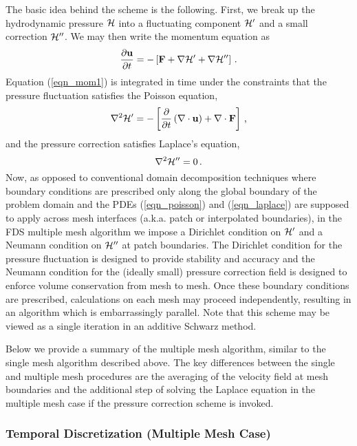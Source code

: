 \documentclass[11pt]{book}
\begin{document}
The basic idea behind the scheme is the following.  First, we break up the hydrodynamic pressure ${\cal H}$ into a fluctuating component ${\cal H}'$ and a small correction $\cal H''$.  We may then write the momentum equation as
\begin{equation}
\label{eqn_mom1}
\frac{\partial \mathbf{u}}{\partial t} = - \left[ \mathbf{F} + \nabla {\cal H}' + \nabla {\cal H}'' \right] \,\mbox{.}
\end{equation}
Equation (\ref{eqn_mom1}) is integrated in time under the constraints that the pressure fluctuation satisfies the Poisson equation,
\begin{equation}
\label{eqn_poisson}
\nabla^2 {\cal H}' = - \left[ \frac{\partial}{\partial t} \left(\nabla\cdot \mathbf{u}\right) + \nabla\cdot \mathbf{F} \right] \,\mbox{,}
\end{equation}
and the pressure correction satisfies Laplace's equation,
\begin{equation}
\label{eqn_laplace}
\nabla^2 {\cal H}'' = 0 \,\mbox{.}
\end{equation}
Now, as opposed to conventional domain decomposition techniques where boundary conditions are prescribed only along the global boundary of the problem domain and the PDEs (\ref{eqn_poisson}) and (\ref{eqn_laplace}) are supposed to apply across mesh interfaces (a.k.a. patch or interpolated boundaries), in the FDS multiple mesh algorithm we impose a Dirichlet condition on ${\cal H}^\prime$ and a Neumann condition on ${\cal H}^{\prime\prime}$ at patch boundaries.  The Dirichlet condition for the pressure fluctuation is designed to provide stability and accuracy and the Neumann condition for the (ideally small) pressure correction field is designed to enforce volume conservation from mesh to mesh.  Once these boundary conditions are prescribed, calculations on each mesh may proceed independently, resulting in an algorithm which is embarrassingly parallel.  Note that this scheme may be viewed as a single iteration in an additive Schwarz method.

Below we provide a summary of the multiple mesh algorithm, similar to the single mesh algorithm described above.  The key differences between the single and multiple mesh procedures are the averaging of the velocity field at mesh boundaries and the additional step of solving the Laplace equation in the multiple mesh case if the pressure correction scheme is invoked.

\subsubsection{Temporal Discretization (Multiple Mesh Case)}
\end{document}
